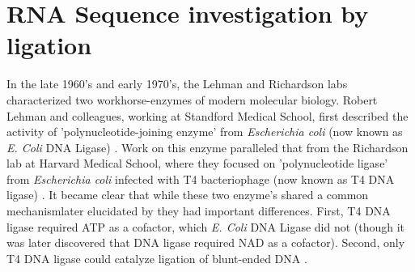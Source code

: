 
\section{RNA Sequence investigation by ligation}\label{sec:Ligation}

In the late 1960's and early 1970's, the Lehman and Richardson labs characterized two workhorse-enzymes of modern molecular biology. Robert Lehman and colleagues, working at Standford Medical School, first described the activity of 'polynucleotide-joining enzyme' from \textit{Escherichia coli} (now known as \textit{E. Coli} DNA Ligase) \citep{Olivera1967b}. Work on this enzyme paralleled that from the Richardson lab at Harvard Medical School, where they focused on 'polynucleotide ligase' from \textit{Escherichia coli} infected with T4 bacteriophage (now known as T4 DNA ligase) \citep{Weiss1967a}. It became clear that while these two enzyme's shared a common mechanism\textemdash later elucidated by \citep{Modrich1973a}\textemdash they had important differences. First, T4 DNA ligase required ATP as a cofactor, which \textit{E. Coli} DNA Ligase did not (though it was later discovered that DNA ligase required NAD as a cofactor). Second, only T4 DNA ligase could catalyze ligation of blunt-ended DNA \citep{Tabor1987a}.

